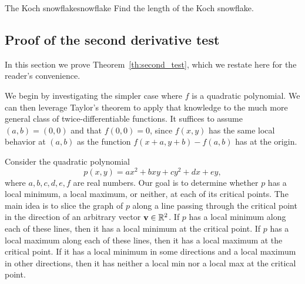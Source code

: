 \documentclass{watsonbook}
\begin{document}
\begin{exercise}{The Koch snowflake}{snowflake}
  Find the length of the Koch snowflake. 
\end{exercise}

\newpage

\subsection{Proof of the second derivative test} \label{sec:proof_sdt}

In this section we prove Theorem~\ref{th:second_test}, which we
restate here for the reader's convenience.

\begin{theo}{}{}
  \secondderivativetest
\end{theo}

\begin{pf}
  We begin by investigating the simpler case where $f$ is a quadratic
  polynomial. We can then leverage Taylor's theorem to apply that
  knowledge to the much more general class of twice-differentiable
  functions. It suffices to assume $(a,b) = (0,0)$ and that
  $f(0,0) = 0$, since $f(x,y)$ has the same local behavior at $(a,b)$
  as the function $f(x+a, y+b)-f(a,b)$ has at the origin.
  
  Consider the quadratic polynomial 
  \[
    p(x,y) = ax^2  + b xy + cy^2 + dx + ey, 
  \]
  where $a,b,c,d,e,f$ are real numbers.  Our goal is to determine
  whether $p$ has a local minimum, a local maximum, or neither, at
  each of its critical points. The main idea is to slice the graph of
  $p$ along a line passing through the critical point in the direction
  of an arbitrary vector $\mathbf{v} \in \mathbb{R}^2$. If $p$ has a local
  minimum along each of these lines, then it has a local minimum at
  the critical point.  If $p$ has a local maximum along each of these
  lines, then it has a local maximum at the critical point. If it has
  a local minimum in some directions and a local maximum in other
  directions, then it has neither a local min nor a local max at the
  critical point.
  

\end{pf}
\end{document}

